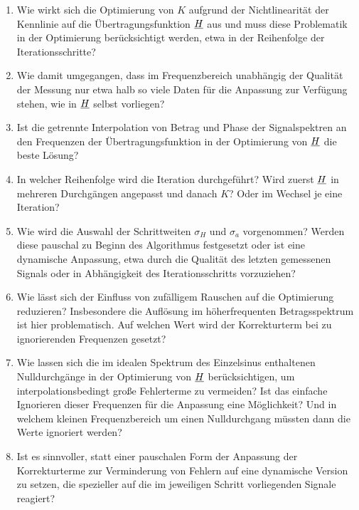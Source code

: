 \documentclass[../Report.tex]{subfiles}
\begin{document}
\begin{enumerate}
	\item 	Wie wirkt sich die Optimierung von $K$ aufgrund der Nichtlinearität der Kennlinie auf die Übertragungsfunktion $\underline{H}$ aus und muss diese Problematik in der Optimierung berücksichtigt werden, etwa in der Reihenfolge der Iterationsschritte?
	
	\item	Wie damit umgegangen, dass im Frequenzbereich unabhängig der Qualität der Messung nur etwa halb so viele Daten für die Anpassung zur Verfügung stehen, wie in $\underline{H}$ selbst vorliegen?
	
	\item 	Ist die getrennte Interpolation von Betrag und Phase der Signalspektren an den Frequenzen der Übertragungsfunktion in der Optimierung von $\underline{H}$ die beste Lösung? 
	
	\item	In welcher Reihenfolge wird die Iteration durchgeführt? Wird zuerst $\underline{H}$ in mehreren Durchgängen angepasst und danach $K$? Oder im Wechsel je eine Iteration?
	
	\item 	Wie wird die Auswahl der Schrittweiten $\sigma_H$ und $\sigma_a$ vorgenommen? Werden diese pauschal zu Beginn des Algorithmus festgesetzt oder ist eine dynamische Anpassung, etwa durch die Qualität des letzten gemessenen Signals oder in Abhängigkeit des Iterationsschritts vorzuziehen? 
	
	\item 	Wie lässt sich der Einfluss von zufälligem Rauschen auf die Optimierung reduzieren? Insbesondere die Auflösung im höherfrequenten Betragsspektrum ist hier problematisch. Auf welchen Wert wird der Korrekturterm bei zu ignorierenden Frequenzen gesetzt?
	
	\item	Wie lassen sich die im idealen Spektrum des Einzelsinus enthaltenen Nulldurchgänge in der Optimierung von $\underline{H}$ berücksichtigen, um interpolationsbedingt große Fehlerterme zu vermeiden? Ist das einfache Ignorieren dieser Frequenzen für die Anpassung eine Möglichkeit? Und in welchem kleinen Frequenzbereich um einen Nulldurchgang müssten dann die Werte ignoriert werden?
	
	
	\item 	Ist es sinnvoller, statt einer pauschalen Form der Anpassung der Korrekturterme zur Verminderung von Fehlern auf eine dynamische Version zu setzen, die spezieller auf die im jeweiligen Schritt vorliegenden Signale reagiert?
	

\end{enumerate}
\end{document}
